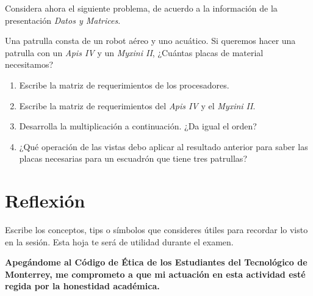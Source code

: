 \documentclass[spanish, 10pt]{article}
\begin{document}
\pagebreak

Considera ahora el siguiente problema, de acuerdo a la información de la presentación \textit{Datos y Matrices}.

Una patrulla consta de un robot aéreo y uno acuático.
Si queremos hacer una patrulla con un \textit{Apis IV} y un \textit{Myxini II}, ¿Cuántas placas de material necesitamos?

\bigskip

\begin{enumerate}
    \itemsep15ex
    \item Escribe la matriz de requerimientos de los procesadores.
    \item Escribe la matriz de requerimientos del \textit{Apis IV} y el \textit{Myxini II}.
    \item Desarrolla la multiplicación a continuación. ¿Da igual el orden?
    \item ¿Qué operación de las vistas debo aplicar al resultado anterior para saber las placas necesarias para un escuadrón que tiene tres patrullas?
\end{enumerate}

\section{Reflexión}

Escribe los conceptos, tips o símbolos que consideres útiles para recordar lo visto en la sesión. Esta hoja te será de utilidad durante el examen.

\vfill

\textbf{Apegándome al Código de Ética de los Estudiantes del Tecnológico de Monterrey, me comprometo a que mi actuación en esta actividad esté regida por la honestidad académica.}
\end{document}
